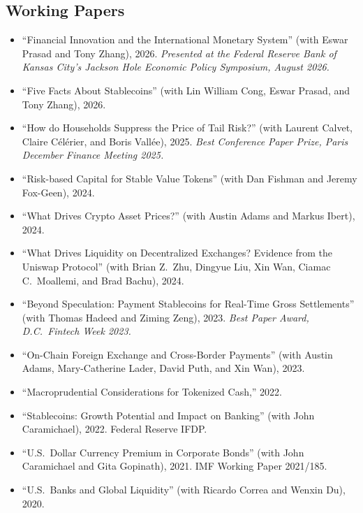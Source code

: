 \documentclass[10.5pt]{article}
\newenvironment{pubs}{\begin{itemize}[leftmargin=0pt,itemindent=0pt,labelsep=0pt,label={},itemsep=3pt,topsep=2pt]}{\end{itemize}}
\begin{document}
\subsection{Working Papers}
\begin{pubs}
\item ``Financial Innovation and the International Monetary System'' (with Eswar Prasad and Tony Zhang), 2026. \emph{Presented at the Federal Reserve Bank of Kansas City's Jackson Hole Economic Policy Symposium, August 2026.}
\item ``Five Facts About Stablecoins'' (with Lin William Cong, Eswar Prasad, and Tony Zhang), 2026.
\item ``How do Households Suppress the Price of Tail Risk?'' (with Laurent Calvet, Claire C\'el\'erier, and Boris Vall\'ee), 2025. \emph{Best Conference Paper Prize, Paris December Finance Meeting 2025.}
\item ``Risk-based Capital for Stable Value Tokens'' (with Dan Fishman and Jeremy Fox-Geen), 2024.
\item ``What Drives Crypto Asset Prices?'' (with Austin Adams and Markus Ibert), 2024.
\item ``What Drives Liquidity on Decentralized Exchanges? Evidence from the Uniswap Protocol'' (with Brian Z.\ Zhu, Dingyue Liu, Xin Wan, Ciamac C.\ Moallemi, and Brad Bachu), 2024.
\item ``Beyond Speculation: Payment Stablecoins for Real-Time Gross Settlements'' (with Thomas Hadeed and Ziming Zeng), 2023. \emph{Best Paper Award, D.C.\ Fintech Week 2023.}
\item ``On-Chain Foreign Exchange and Cross-Border Payments'' (with Austin Adams, Mary-Catherine Lader, David Puth, and Xin Wan), 2023.
\item ``Macroprudential Considerations for Tokenized Cash,'' 2022.
\item ``Stablecoins: Growth Potential and Impact on Banking'' (with John Caramichael), 2022. Federal Reserve IFDP.
\item ``U.S.\ Dollar Currency Premium in Corporate Bonds'' (with John Caramichael and Gita Gopinath), 2021. IMF Working Paper 2021/185.
\item ``U.S.\ Banks and Global Liquidity'' (with Ricardo Correa and Wenxin Du), 2020.
\end{pubs}
\end{document}
